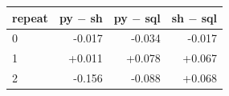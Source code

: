 \begin{tabular}{lrrr}
\toprule
repeat & py $-$ sh & py $-$ sql & sh $-$ sql \\
\midrule
0 & -0.017 & -0.034 & -0.017 \\
1 & +0.011 & +0.078 & +0.067 \\
2 & -0.156 & -0.088 & +0.068 \\
\bottomrule
\end{tabular}
